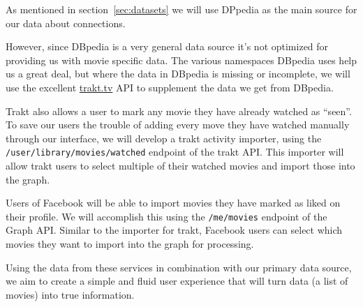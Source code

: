 As mentioned in section~\ref{sec:datasets} we will use DPpedia as the main source
for our data about connections.

However, since DBpedia is a very general data source it's not optimized
for providing us with movie specific data.
The various namespaces DBpedia uses help us a great deal,
but where the data in DBpedia is missing or incomplete,
we will use the excellent \href{http://trakt.tv/}{trakt.tv} API
to supplement the data we get from DBpedia.

Trakt also allows a user to mark any movie they have
already watched as ``seen''.
To save our users the trouble of adding every move they
have watched manually through our interface, we will
develop a trakt activity importer, using the
\texttt{/user/library/movies/watched} endpoint of the
trakt API.
This importer will allow trakt users to select multiple
of their watched movies and import those into the graph.

Users of Facebook will be able to import movies they
have marked as liked on their profile.
We will accomplish this using the \texttt{/me/movies}
endpoint of the Graph API.
Similar to the importer for trakt, Facebook users can
select which movies they want to import into the graph
for processing.

Using the data from these services in combination with
our primary data source, we aim to create a simple
and fluid user experience that will turn data (a list
of movies) into true information.
